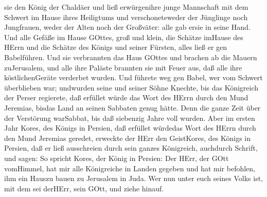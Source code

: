sie den König der Chaldäer und ließ erwürgenihre junge Mannschaft mit
dem Schwert im Hause ihres Heiligtums und verschoneteweder der Jünglinge
noch Jungfrauen, weder der Alten noch der Großväter: alle gab ersie in
seine Hand.  Und alle Gefäße im Hause GOttes, groß und
klein, die Schätze imHause des HErrn und die Schätze des Königs und
seiner Fürsten, alles ließ er gen Babelführen.  Und sie
verbrannten das Haus GOttes und brachen ab die Mauern zuJerusalem, und
alle ihre Paläste brannten sie mit Feuer aus, daß alle ihre
köstlichenGeräte verderbet wurden.  Und führete weg gen
Babel, wer vom Schwert überblieben war; undwurden seine und seiner Söhne
Knechte, bis das Königreich der Perser regierete,  daß
erfüllet würde das Wort des HErrn durch den Mund Jeremias, bisdas Land
an seinen Sabbaten genug hätte. Denn die ganze Zeit über der Verstörung
warSabbat, bis daß siebenzig Jahre voll wurden.  Aber im
ersten Jahr Kores, des Königs in Persien, daß erfüllet würdedas Wort des
HErrn durch den Mund Jeremias geredet, erweckte der HErr den GeistKores,
des Königs in Persien, daß er ließ ausschreien durch sein ganzes
Königreich, auchdurch Schrift, und sagen:  So spricht
Kores, der König in Persien: Der HErr, der GOtt vomHimmel, hat mir alle
Königreiche in Landen gegeben und hat mir befohlen, ihm ein Hauszu bauen
zu Jerusalem in Juda. Wer nun unter euch seines Volks ist, mit dem sei
derHErr, sein GOtt, und ziehe hinauf.
